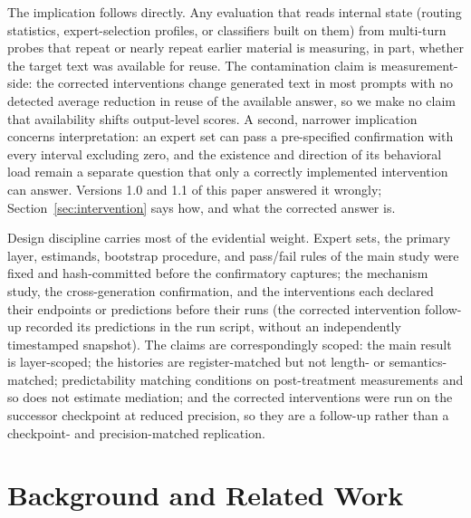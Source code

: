 \documentclass[10pt,a4paper,twocolumn]{article}
\begin{document}
The implication follows directly. Any evaluation that reads internal state
(routing statistics, expert-selection profiles, or classifiers built on
them) from multi-turn probes that repeat or nearly repeat earlier material
is measuring, in part, whether the target text was available for reuse. The
contamination claim is measurement-side: the corrected interventions change
generated text in most prompts with no detected average reduction in reuse
of the available answer, so we make no claim that availability shifts output-level
scores. A second, narrower implication concerns interpretation: an expert
set can pass a pre-specified confirmation with every interval excluding
zero, and the existence and direction of its behavioral load remain a
separate question that only a correctly implemented intervention can
answer. Versions 1.0 and 1.1 of this paper answered it wrongly;
Section~\ref{sec:intervention} says how, and what the corrected answer is.

Design discipline carries most of the evidential weight. Expert sets, the
primary layer, estimands, bootstrap procedure, and pass/fail rules of the main
study were fixed and hash-committed before the confirmatory captures; the
mechanism study, the cross-generation confirmation, and the interventions each
declared their endpoints or predictions before their runs (the corrected
intervention follow-up recorded its predictions in the run script, without
an independently timestamped snapshot). The claims are
correspondingly scoped: the main result is layer-scoped; the histories are
register-matched but not length- or semantics-matched; predictability matching
conditions on post-treatment measurements and so does not estimate mediation;
and the corrected interventions were run on the successor checkpoint at
reduced precision, so they are a follow-up rather than a checkpoint- and
precision-matched replication.

\section{Background and Related Work}
\end{document}
